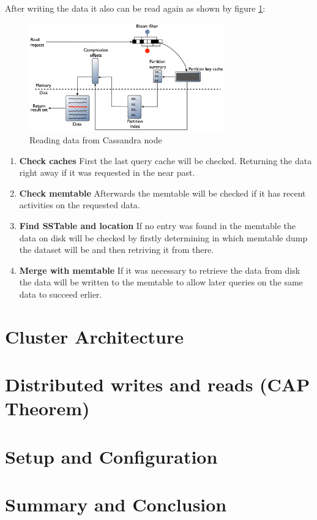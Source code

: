 After writing the data it also can be read again as shown by figure \ref{fig:cassandra:readData}:
\begin{figure}[ht]
    \centering
    \includegraphics[width=0.75\textwidth]{img/cassandra_local_read.png}
    \caption{Reading data from Cassandra node \autocite{datastaxReadData}}
    \label{fig:cassandra:readData}
\end{figure}
\begin{enumerate}
    \item \textbf{Check caches} First the last query cache will be checked. Returning the data right away if it was requested in the near past.
    \item \textbf{Check memtable} Afterwards the memtable will be checked if it has recent activities on the requested data.
    \item \textbf{Find SSTable and location} If no entry was found in the memtable the data on disk will be checked by firstly determining in which memtable dump the dataset will be and then retriving it from there.
    \item \textbf{Merge with memtable} If it was necessary to retrieve the data from disk the data will be written to the memtable to allow later queries on the same data to succeed erlier.
\end{enumerate}

\section{Cluster Architecture}\label{sec:CassandraClusterArchitecture}  %

\section{Distributed writes and reads (CAP Theorem)}

\section{Setup and Configuration}  %

\section{Summary and Conclusion}
